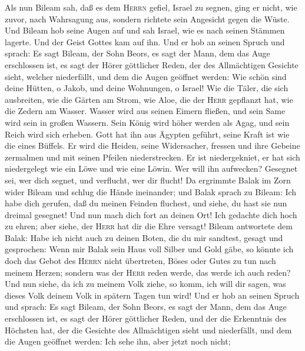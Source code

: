  Als nun Bileam sah, daß es dem \textsc{Herrn} gefiel,
Israel zu segnen, ging er nicht, wie zuvor, nach Wahrsagung aus, sondern
richtete sein Angesicht gegen die Wüste.  Und Bileam hob
seine Augen auf und sah Israel, wie es nach seinen Stämmen lagerte. Und
der Geist Gottes kam auf ihn.  Und er hob an seinen Spruch
und sprach: Es sagt Bileam, der Sohn Beors, es sagt der Mann, dem das
Auge erschlossen ist, es sagt der Hörer göttlicher Reden, 
der des Allmächtigen Gesichte sieht, welcher niederfällt, und dem die
Augen geöffnet werden:  Wie schön sind deine Hütten, o
Jakob, und deine Wohnungen, o Israel!  Wie die Täler, die
sich ausbreiten, wie die Gärten am Strom, wie Aloe, die der
\textsc{Herr} gepflanzt hat, wie die Zedern am Wasser. 
Wasser wird aus seinen Eimern fließen, und sein Same wird sein in großen
Wassern. Sein König wird höher werden als Agag, und sein Reich wird sich
erheben.  Gott hat ihn aus Ägypten geführt, seine Kraft
ist wie die eines Büffels. Er wird die Heiden, seine Widersacher,
fressen und ihre Gebeine zermalmen und mit seinen Pfeilen
niederstrecken.  Er ist niedergekniet, er hat sich
niedergelegt wie ein Löwe und wie eine Löwin. Wer will ihn aufwecken?
Gesegnet sei, wer dich segnet, und verflucht, wer dir flucht!
 Da ergrimmte Balak im Zorn wider Bileam und schlug die
Hände ineinander; und Balak sprach zu Bileam: Ich habe dich gerufen, daß
du meinen Feinden fluchest, und siehe, du hast sie nun dreimal gesegnet!
 Und nun mach dich fort an deinen Ort! Ich gedachte dich
hoch zu ehren; aber siehe, der \textsc{Herr} hat dir die Ehre versagt!
 Bileam antwortete dem Balak: Habe ich nicht auch zu
deinen Boten, die du mir sandtest, gesagt und gesprochen:
 Wenn mir Balak sein Haus voll Silber und Gold gäbe, so
könnte ich doch das Gebot des \textsc{Herrn} nicht übertreten, Böses
oder Gutes zu tun nach meinem Herzen; sondern was der \textsc{Herr}
reden werde, das werde ich auch reden?  Und nun siehe, da
ich zu meinem Volk ziehe, so komm, ich will dir sagen, was dieses Volk
deinem Volk in spätern Tagen tun wird!  Und er hob an
seinen Spruch und sprach: Es sagt Bileam, der Sohn Beors, es sagt der
Mann, dem das Auge erschlossen ist,  es sagt der Hörer
göttlicher Reden, und der die Erkenntnis des Höchsten hat, der die
Gesichte des Allmächtigen sieht und niederfällt, und dem die Augen
geöffnet werden:  Ich sehe ihn, aber jetzt noch nicht;
